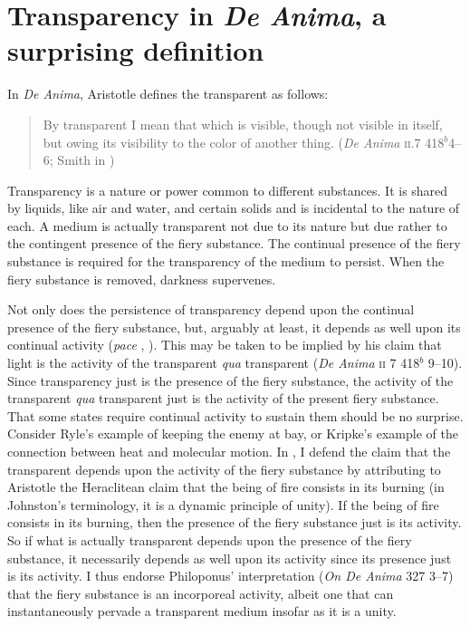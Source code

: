 \documentclass[12pt]{article}
\begin{document}


\section{Transparency in \emph{De Anima}, a surprising definition} %
\label{sec:transparency_in_de anima_a_surprising_definition}

In \emph{De Anima}, Aristotle defines the transparent as follows:
\begin{quote}
	By transparent I mean that which is visible, though not visible in itself, but owing its visibility to the color of another thing. (\emph{De Anima} \textsc{ii}.7 418\( ^{b} \)4--6; Smith in \citealt[32]{Barnes:1984uq})
\end{quote}
Transparency is a nature or power common to different substances. It is shared by liquids, like air and water, and certain solids and is incidental to the nature of each. A medium is actually transparent not due to its nature but due rather to the contingent presence of the fiery substance. The continual presence of the fiery substance is required for the transparency of the medium to persist. When the fiery substance is removed, darkness supervenes. 

	Not only does the persistence of transparency depend upon the continual presence of the fiery substance, but, arguably at least, it depends as well upon its continual activity (\emph{pace} \citealt[]{Sambursky:1958aa}, \citealt[424]{Burnyeat:1995fk}). This may be taken to be implied by his claim that light is the activity of the transparent \emph{qua} transparent (\emph{De Anima} \textsc{ii} 7 418\( ^{b} \) 9--10). Since transparency just is the presence of the fiery substance, the activity of the transparent \emph{qua} transparent just is the activity of the present fiery substance. That some states require continual activity to sustain them should be no surprise. Consider Ryle's \citeyearpar[149]{Ryle:1949qr} example of keeping the enemy at bay, or Kripke's \citeyearpar{kripke72} example of the connection between heat and molecular motion. In \citet[chapter 3]{Kalderon:2015fr}, I defend the claim that the transparent depends upon the activity of the fiery substance by attributing to Aristotle the Heraclitean claim that the being of fire consists in its burning (in Johnston's \citeyear[663--4]{Johnston:2006js} terminology, it is a dynamic principle of unity). If the being of fire consists in its burning, then the presence of the fiery substance just is its activity. So if what is actually transparent depends upon the presence of the fiery substance, it necessarily depends as well upon its activity since its presence just is its activity. I thus endorse Philoponus' interpretation (\emph{On \emph{De Anima}} 327 3--7) that the fiery substance is an incorporeal activity, albeit one that can instantaneously pervade a transparent medium insofar as it is a unity.
\end{document}
